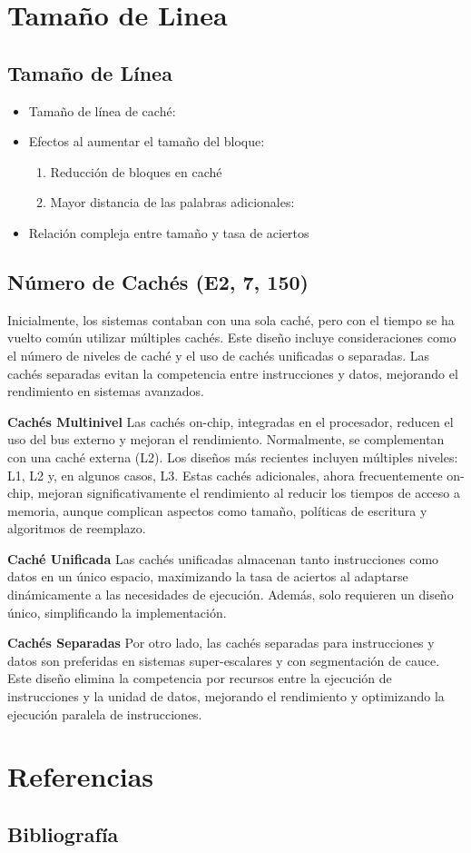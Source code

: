 \documentclass[presentation]{beamer}
\begin{document}
\section{Tamaño de Linea}
\label{sec:orgfe2b2c6}
\subsection{Tamaño de Línea}
\label{sec:orgbc0a72e}
\begin{itemize}
\item Tamaño de línea de caché:
\item Efectos al aumentar el tamaño del bloque:
\begin{enumerate}
\item Reducción de bloques en caché
\item Mayor distancia de las palabras adicionales:
\end{enumerate}
\item Relación compleja entre tamaño y tasa de aciertos
\end{itemize}
\subsection{Número de Cachés (E2, 7, 150)}
\label{sec:orgff3abd1}
Inicialmente, los sistemas contaban con una sola caché, pero con el tiempo se ha vuelto común utilizar múltiples cachés. Este diseño incluye consideraciones como el número de niveles de caché y el uso de cachés unificadas o separadas. Las cachés separadas evitan la competencia entre instrucciones y datos, mejorando el rendimiento en sistemas avanzados.

\textbf{\textbf{Cachés Multinivel}}
Las cachés on-chip, integradas en el procesador, reducen el uso del bus externo y mejoran el rendimiento. Normalmente, se complementan con una caché externa (L2). Los diseños más recientes incluyen múltiples niveles: L1, L2 y, en algunos casos, L3. Estas cachés adicionales, ahora frecuentemente on-chip, mejoran significativamente el rendimiento al reducir los tiempos de acceso a memoria, aunque complican aspectos como tamaño, políticas de escritura y algoritmos de reemplazo.

\textbf{\textbf{Caché Unificada}}
Las cachés unificadas almacenan tanto instrucciones como datos en un único espacio, maximizando la tasa de aciertos al adaptarse dinámicamente a las necesidades de ejecución. Además, solo requieren un diseño único, simplificando la implementación.

\textbf{\textbf{Cachés Separadas}}
Por otro lado, las cachés separadas para instrucciones y datos son preferidas en sistemas super-escalares y con segmentación de cauce. Este diseño elimina la competencia por recursos entre la ejecución de instrucciones y la unidad de datos, mejorando el rendimiento y optimizando la ejecución paralela de instrucciones.

\section{Referencias}
\label{sec:org51a2802}
\subsection{Bibliografía}
\label{sec:orgcbb9b91}
\printbibliography
\end{document}
